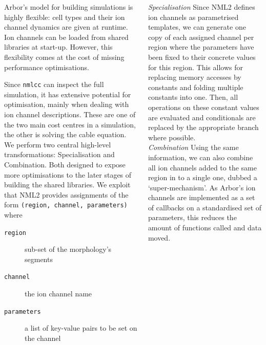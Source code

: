 \documentclass{beamer}
\begin{document}
\begin{frame}[t, fragile]
\begin{columns}[t]
\begin{column}{0.49\textwidth}
      Arbor's model for building simulations is highly flexible: cell types and
      their ion channel dynamics are given at runtime. Ion channels can be
      loaded from shared libraries at start-up. However, this flexibility comes
      at the cost of missing performance optimisations.

      Since \texttt{nmlcc} can inspect the full simulation, it has extensive
      potential for optimisation, mainly when dealing with ion channel
      descriptions. These are one of the two main cost centres in a simulation,
      the other is solving the cable equation. We perform two central high-level
      transformations: Specialisation and Combination. Both designed to expose
      more optimisations to the later stages of building the shared libraries.
      We exploit that NML2 provides assignments of the form
      \verb!(region, channel, parameters)! where
      \begin{description}
        \item[\texttt{region}] sub-set of the morphology's segments
        \item[\texttt{channel}] the ion channel name
        \item[\texttt{parameters}] a list of key-value pairs to be set on the channel
      \end{description}
    \end{column}
    \begin{column}{0.49\textwidth}
      \emph{Specialisation} Since NML2 defines ion channels as parametrised
      templates, we can generate one copy of each assigned channel per region
      where the parameters have been fixed to their concrete values for this
      region. This allows for replacing memory accesses by constants and folding
      multiple constants into one. Then, all operations on these constant values
      are evaluated and conditionals are replaced by the appropriate branch
      where possible.\\[1.5ex]
      \emph{Combination} Using the same information, we can also combine all ion
      channels added to the same region in to a single one, dubbed a
      `super-mechanism'. As Arbor's ion channels are implemented as a set of
      callbacks on a standardised set
      of parameters, this reduces the amount of functions called and data moved.\\[1.5ex]


\end{column}
\end{columns}
\end{frame}
\end{document}
